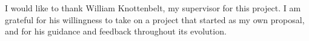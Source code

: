 \documentclass[
    11pt,
    oneside, %
    english,
    singlespacing, %
    parskip, %
    headsepline, %
]{MastersDoctoralThesis}
\theoremstyle{definition}
\begin{document}
    \begin{acknowledgements}
        \addchaptertocentry{\acknowledgementname} %
        I would like to thank William Knottenbelt, my supervisor for this project.
        I am grateful for his willingness to take on a project that started as my own proposal, and for his guidance and feedback throughout its evolution.
    \end{acknowledgements}

    \tableofcontents
    \listoffigures
    \listoftables
    \listoflistings

    \setlength{\parindent}{0pt}


    \mainmatter %

    \pagestyle{thesis} %


    
    
    
    
    
    
    

    \appendix

    
    
    

    \printbibliography[heading=bibintoc]
\end{document}

